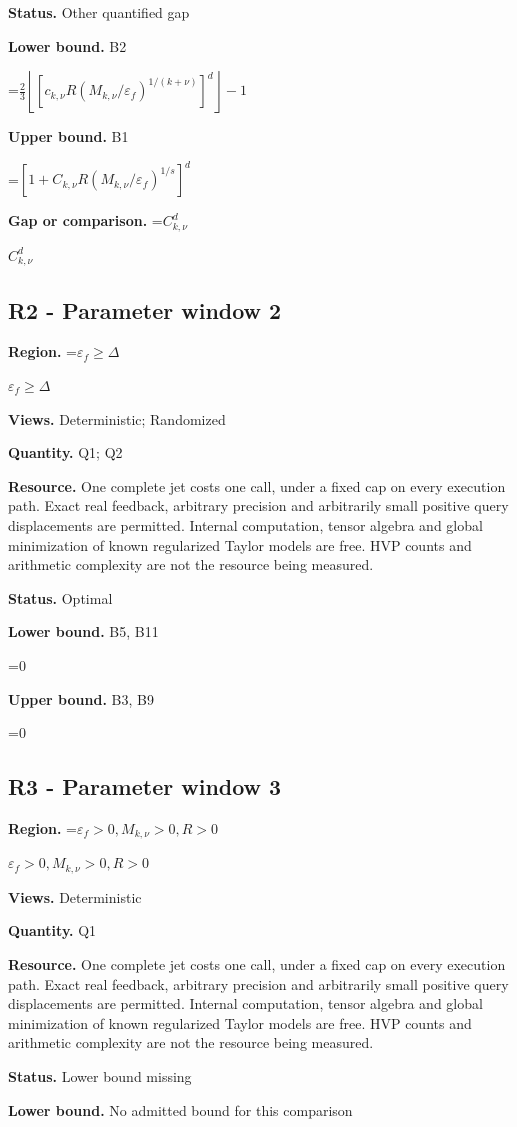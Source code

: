 \documentclass[10pt,a4paper]{article}
\newcommand{\AtlasMath}[1]{\par\begingroup\centering\setbox0=\hbox{$\displaystyle #1$}\ifdim\wd0>1.4\linewidth\typeout{ATLAS WIDE FORMULA: \the\wd0}\fi\ifdim\wd0>\linewidth\resizebox{\linewidth}{!}{\box0}\else\box0\fi\par\endgroup}
\newcommand{\AtlasInlineMath}[1]{\begingroup\setbox0=\hbox{$#1$}\ifdim\wd0>.4\linewidth\endgroup\AtlasMath{#1}\else\endgroup$#1$\fi}
\begin{document}
\textbf{Status.} Other quantified gap

\textbf{Lower bound.} B2

\AtlasMath{\frac23\left\lfloor[c_{k,\nu}R(M_{k,\nu}/\varepsilon_f)^{1/(k+\nu)}]^d\right\rfloor-1}
\textbf{Upper bound.} B1

\AtlasMath{[1+C_{k,\nu}R(M_{k,\nu}/\varepsilon_f)^{1/s}]^d}
\textbf{Gap or comparison.} \AtlasInlineMath{C_{k,\nu}^{d}}

\subsection{R2 - Parameter window 2}
\textbf{Region.} \AtlasInlineMath{\varepsilon_f\ge \Delta}

\textbf{Views.} Deterministic; Randomized

\textbf{Quantity.} Q1; Q2

\textbf{Resource.} One complete jet costs one call, under a fixed cap on every execution path. Exact real feedback, arbitrary precision and arbitrarily small positive query displacements are permitted. Internal computation, tensor algebra and global minimization of known regularized Taylor models are free. HVP counts and arithmetic complexity are not the resource being measured.

\textbf{Status.} Optimal

\textbf{Lower bound.} B5, B11

\AtlasMath{0}
\textbf{Upper bound.} B3, B9

\AtlasMath{0}
\subsection{R3 - Parameter window 3}
\textbf{Region.} \AtlasInlineMath{\varepsilon_f>0,M_{k,\nu}>0,R>0}

\textbf{Views.} Deterministic

\textbf{Quantity.} Q1

\textbf{Resource.} One complete jet costs one call, under a fixed cap on every execution path. Exact real feedback, arbitrary precision and arbitrarily small positive query displacements are permitted. Internal computation, tensor algebra and global minimization of known regularized Taylor models are free. HVP counts and arithmetic complexity are not the resource being measured.

\textbf{Status.} Lower bound missing

\textbf{Lower bound.} No admitted bound for this comparison
\end{document}
